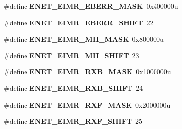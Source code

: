 \begin{DoxyCompactItemize}
\item 
\hypertarget{group___e_n_e_t___register___masks_ga3934d5654ba643ea4b989b299418dc22}{}\#define {\bfseries E\+N\+E\+T\+\_\+\+E\+I\+M\+R\+\_\+\+E\+B\+E\+R\+R\+\_\+\+M\+A\+S\+K}~0x400000u\label{group___e_n_e_t___register___masks_ga3934d5654ba643ea4b989b299418dc22}

\item 
\hypertarget{group___e_n_e_t___register___masks_ga37f7aee11fab88919e4c11f1a916bdb4}{}\#define {\bfseries E\+N\+E\+T\+\_\+\+E\+I\+M\+R\+\_\+\+E\+B\+E\+R\+R\+\_\+\+S\+H\+I\+F\+T}~22\label{group___e_n_e_t___register___masks_ga37f7aee11fab88919e4c11f1a916bdb4}

\item 
\hypertarget{group___e_n_e_t___register___masks_ga76b5d13b0a814e6201d6d4815bf5afbd}{}\#define {\bfseries E\+N\+E\+T\+\_\+\+E\+I\+M\+R\+\_\+\+M\+I\+I\+\_\+\+M\+A\+S\+K}~0x800000u\label{group___e_n_e_t___register___masks_ga76b5d13b0a814e6201d6d4815bf5afbd}

\item 
\hypertarget{group___e_n_e_t___register___masks_gaa6d43005c24a4fc636a2c1310aae4225}{}\#define {\bfseries E\+N\+E\+T\+\_\+\+E\+I\+M\+R\+\_\+\+M\+I\+I\+\_\+\+S\+H\+I\+F\+T}~23\label{group___e_n_e_t___register___masks_gaa6d43005c24a4fc636a2c1310aae4225}

\item 
\hypertarget{group___e_n_e_t___register___masks_gade7a0df0826b6d0c11f3b0e545e17535}{}\#define {\bfseries E\+N\+E\+T\+\_\+\+E\+I\+M\+R\+\_\+\+R\+X\+B\+\_\+\+M\+A\+S\+K}~0x1000000u\label{group___e_n_e_t___register___masks_gade7a0df0826b6d0c11f3b0e545e17535}

\item 
\hypertarget{group___e_n_e_t___register___masks_gab1b2e526363f6abb22c5d228e8bfb461}{}\#define {\bfseries E\+N\+E\+T\+\_\+\+E\+I\+M\+R\+\_\+\+R\+X\+B\+\_\+\+S\+H\+I\+F\+T}~24\label{group___e_n_e_t___register___masks_gab1b2e526363f6abb22c5d228e8bfb461}

\item 
\hypertarget{group___e_n_e_t___register___masks_gaa22528ac89efc6fe663951b8c3eac045}{}\#define {\bfseries E\+N\+E\+T\+\_\+\+E\+I\+M\+R\+\_\+\+R\+X\+F\+\_\+\+M\+A\+S\+K}~0x2000000u\label{group___e_n_e_t___register___masks_gaa22528ac89efc6fe663951b8c3eac045}

\item 
\hypertarget{group___e_n_e_t___register___masks_ga78a295cf5fe590daeb081dafd03a9155}{}\#define {\bfseries E\+N\+E\+T\+\_\+\+E\+I\+M\+R\+\_\+\+R\+X\+F\+\_\+\+S\+H\+I\+F\+T}~25\label{group___e_n_e_t___register___masks_ga78a295cf5fe590daeb081dafd03a9155}


\end{DoxyCompactItemize}

